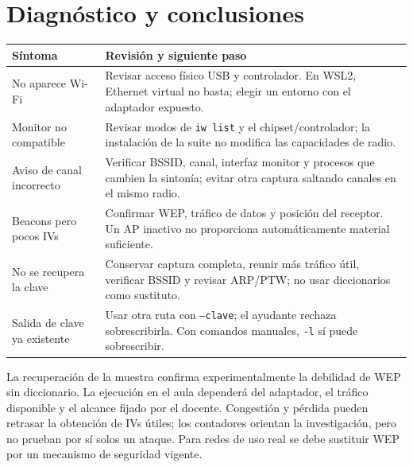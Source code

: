\documentclass[11pt,a4paper]{article}
\begin{document}
\section{Diagnóstico y conclusiones}
\begin{tabularx}{\linewidth}{|p{4cm}|X|}\hline
Síntoma & Revisión y siguiente paso \\\hline
No aparece Wi-Fi & Revisar acceso físico USB y controlador. En WSL2, Ethernet
virtual no basta; elegir un entorno con el adaptador expuesto. \\\hline
Monitor no compatible & Revisar modos de \texttt{iw list} y el chipset/controlador;
la instalación de la suite no modifica las capacidades de radio. \\\hline
Aviso de canal incorrecto & Verificar BSSID, canal, interfaz monitor y procesos
que cambien la sintonía; evitar otra captura saltando canales en el mismo radio. \\\hline
Beacons pero pocos IVs & Confirmar WEP, tráfico de datos y posición del receptor.
Un AP inactivo no proporciona automáticamente material suficiente. \\\hline
No se recupera la clave & Conservar captura completa, reunir más tráfico útil,
verificar BSSID y revisar ARP/PTW; no usar diccionarios como sustituto. \\\hline
Salida de clave ya existente & Usar otra ruta con \texttt{--clave}; el ayudante
rechaza sobrescribirla. Con comandos manuales, \texttt{-l} sí puede sobrescribir. \\\hline
\end{tabularx}

La recuperación de la muestra confirma experimentalmente la debilidad de WEP
sin diccionario. La ejecución en el aula dependerá del adaptador, el tráfico
disponible y el alcance fijado por el docente. Congestión y pérdida pueden
retrasar la obtención de IVs útiles; los contadores orientan la investigación,
pero no prueban por sí solos un ataque. Para redes de uso real se debe sustituir
WEP por un mecanismo de seguridad vigente.
\end{document}
